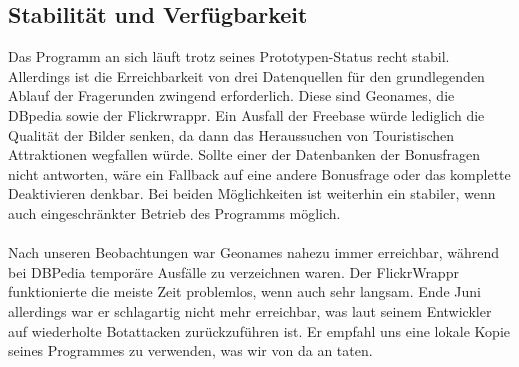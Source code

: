 \documentclass[a4paper, 11pt]{article}
\begin{document}
\subsection{Stabilität und Verfügbarkeit}
Das Programm an sich läuft trotz seines Prototypen-Status recht stabil. Allerdings ist die Erreichbarkeit von drei Datenquellen für den grundlegenden Ablauf der Fragerunden zwingend erforderlich. Diese sind Geonames, die DBpedia sowie der Flickrwrappr. Ein Ausfall der Freebase würde lediglich die Qualität der Bilder senken, da dann das Heraussuchen von Touristischen Attraktionen wegfallen würde. Sollte einer der Datenbanken der Bonusfragen nicht antworten, wäre ein Fallback auf eine andere Bonusfrage oder das komplette Deaktivieren denkbar. Bei beiden Möglichkeiten ist weiterhin ein stabiler, wenn auch eingeschränkter Betrieb des Programms möglich.\\\\ 
Nach unseren Beobachtungen war Geonames nahezu immer erreichbar, während bei DBPedia temporäre Ausfälle zu verzeichnen waren. Der FlickrWrappr funktionierte die meiste Zeit problemlos, wenn auch sehr langsam. Ende Juni allerdings war er schlagartig nicht mehr erreichbar, was laut seinem Entwickler auf wiederholte Botattacken zurückzuführen ist. Er empfahl uns eine lokale Kopie seines Programmes zu verwenden, was wir von da an taten.
\end{document}
